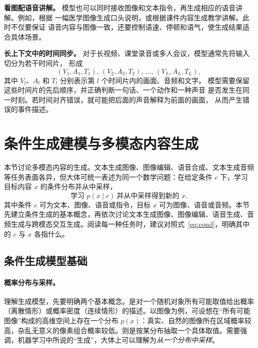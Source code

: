 \noindent\textbf{看图配语音讲解。}
模型也可以同时接收图像和文本指令，再生成相应的语音讲解。例如，根据
一幅医学图像生成口头说明，或根据课件内容生成教学讲解。此时不仅要保证
语音内容与图像一致，还要控制语速、停顿和语气，使生成结果适合具体场景。

\noindent\textbf{长上下文中的时间同步。}
对于长视频、课堂录音或多人会议，模型通常先将输入切分为若干时间片，
形成
\[
  (V_1,A_1,T_1),\,
  (V_2,A_2,T_2),\,
  \ldots,\,
  (V_L,A_L,T_L),
\]
其中 $V_l$、$A_l$ 和 $T_l$ 分别表示第 $l$ 个时间片内的画面、音频和文字。
模型需要保留这些时间片的先后顺序，并正确判断一句话、一个动作和一种声音
是否发生在同一时刻。若时间对齐错误，就可能把后面的声音解释为前面的画面，
从而产生错误的事件描述。


\section{条件生成建模与多模态内容生成}
\label{sec:generation}

本节讨论多模态内容的生成。文本生成图像、图像编辑、语音合成、文本生成音频等任务表面各异，但大体可统一表述为同一个数学问题：在给定条件 $c$ 下，学习目标内容 $x$ 的条件分布并从中采样，
\begin{equation}
  \text{学习 } p(x\mid c)\ \text{并从中采样得到新的 } x .
  \label{eq:cond}
\end{equation}
其中条件 $c$ 可为文本、图像、语音或指令，目标 $x$ 可为图像、语音或音频。本节先建立条件生成的基本概念，再依次讨论文本生成图像、图像编辑、语音生成、音频生成与跨模态交互生成。阅读每一种任务时，建议对照式~\eqref{eq:cond}，明确其中的 $c$ 与 $x$ 各指什么。

\subsection{条件生成模型基础}
\label{sub:genbasic}

\paragraph{概率分布与采样。}理解生成模型，先要明确两个基本概念。是对一个随机对象所有可能取值给出概率（离散情形）或概率密度（连续情形）的描述。以图像为例，可设想在“所有可能图像”构成的高维空间上存在一个分布 $p(x)$：真实、自然的图像所在区域概率较高，杂乱无意义的像素组合概率较低。则是按某分布抽取一个具体取值。需要强调，机器学习中所说的“生成”，大体上可以理解为\emph{从一个分布中采样}。

